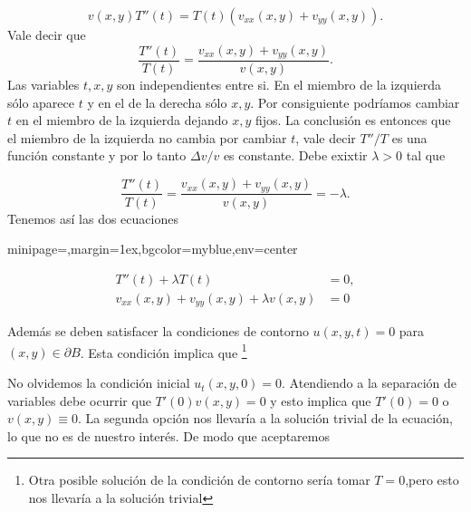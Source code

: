 \documentclass{article}
\newenvironment{colbox}[2]{%
    \begin{adjustbox}{minipage={\linewidth},margin=1ex,bgcolor=#1,env=center}
        #2}{%
    \end{adjustbox}%
}
\begin{document}
\begin{equation}\label{eq:sep_var}v(x,y)T''(t)=T(t)\left(v_{xx}(x,y)+v_{yy}(x,y) \right).
\end{equation}
Vale decir que
\[\frac{T''(t)}{T(t) }=\frac{v_{xx}(x,y)+v_{yy}(x,y)}{v(x,y)}.\]
Las variables $t,x,y$ son independientes entre si.  En el miembro de la izquierda sólo aparece $t$ y en el de la derecha sólo $x,y$.  Por consiguiente  podríamos cambiar $t$ en el miembro de la izquierda dejando $x,y$ fijos. La conclusión es entonces que el miembro de la izquierda no cambia por cambiar $t$, vale decir $T''/T$ es una función constante y por lo tanto $\Delta v/v$ es constante. Debe exixtir $\lambda>0$ tal que
 
 \[\frac{T''(t)}{T(t) }=\frac{v_{xx}(x,y)+v_{yy}(x,y)}{v(x,y)}=-\lambda.\]
Tenemos así las dos ecuaciones
\begin{colbox}{myblue}{
\begin{align}
  T''(t)+\lambda T(t)&=0,\label{eq:eq_t}\\
  v_{xx}(x,y)+v_{yy}(x,y)+\lambda v(x,y)&=0\label{eq:eq_xy}
\end{align}
}
\end{colbox}

Además se deben satisfacer la condiciones de contorno  $u(x,y,t)=0$ para  $(x,y)\in \partial B$. Esta condición implica que \footnote{Otra posible solución de la condición de contorno sería tomar  $T=0$,pero esto  nos llevaría a la solución trivial}

No olvidemos  la condición inicial $u_t(x,y,0)=0$. Atendiendo a la separación de variables debe ocurrir que $T'(0)v(x,y)=0$ y esto implica que  $T'(0)=0$ o $v(x,y)\equiv 0$. La segunda opción nos llevaría a  la solución trivial de la ecuación, lo que no es de nuestro interés. De modo que aceptaremos

\end{document}
